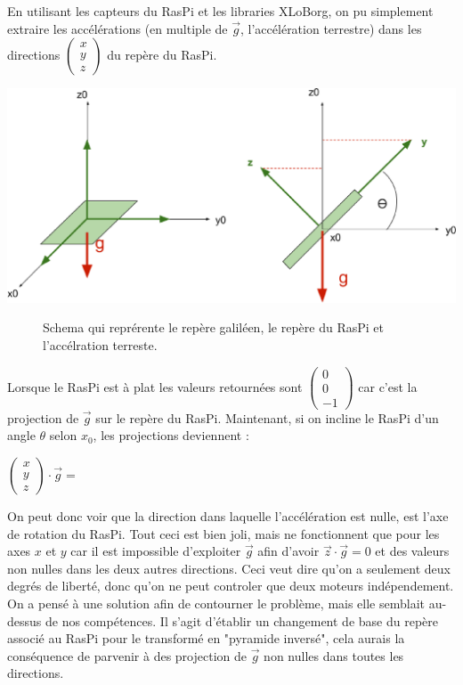 \documentclass[twoside,twocolumn, 16pt]{article}
\newcommand{\icol}[1]{%
  \left(\begin{smallmatrix}#1\end{smallmatrix}\right)%
}
\begin{document}
En utilisant les capteurs du RasPi et les libraries XLoBorg, on pu simplement extraire les accélérations (en multiple de $\vec{g}$, l'accélération terrestre) dans les directions $\icol{x\\y\\z}$ du repère du RasPi. 
\begin{center}
\includegraphics [scale = 0.23] {acc.eps}
\begin{figure}[!h]
\caption{Schema qui reprérente le repère galiléen, le repère du RasPi et l'accélration terreste.}
\end{figure}
\end{center}
Lorsque le RasPi est à plat les valeurs retournées sont $\icol{0\\0\\-1}$ car c'est la projection de $\vec{g}$ sur le repère du RasPi. Maintenant, si on incline le RasPi d'un angle $\theta$ selon $x_0$, les projections deviennent :
\begin{center}
$\icol{x\\y\\z} \cdot \vec{g} =$  \\
\end{center}
\indent On peut donc voir que la direction dans laquelle l'accélération est nulle, est l'axe de rotation du RasPi. Tout ceci est bien joli, mais ne fonctionnent que pour les axes $x$ et $y$ car il est impossible d'exploiter $\vec{g}$ afin d'avoir  $\vec{z} \cdot \vec{g} = 0$ et des valeurs non nulles dans les deux autres directions. Ceci veut dire qu'on a seulement deux degrés de liberté, donc qu'on ne peut controler que deux moteurs indépendement. \\
\indent On a pensé à une solution afin de contourner le problème, mais elle semblait au-dessus de nos compétences. Il s'agit d'établir un changement de base du repère associé au RasPi pour le transformé en "pyramide inversé", cela aurais la conséquence de parvenir à des projection de $\vec{g}$ non nulles dans toutes les directions. 
\end{document}
